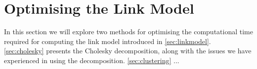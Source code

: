 \section{Optimising the Link Model}\label{sec:optimization}
In this section we will explore two methods for optimising the computational time required for computing the link model introduced in \autoref{sec:linkmodel}. \autoref{sec:cholesky} presents the Cholesky decomposition, along with the issues we have experienced in using the decomposition. \autoref{sec:clustering} ...




